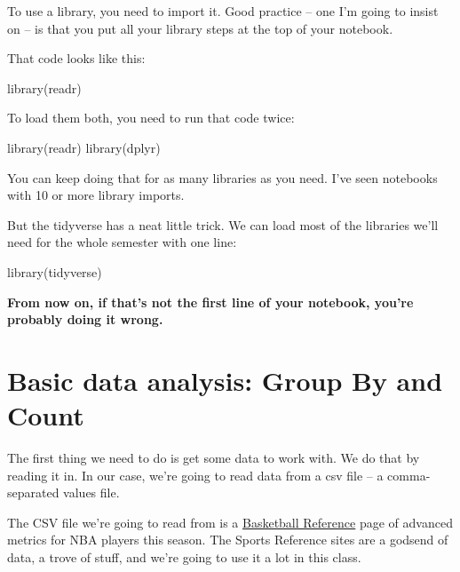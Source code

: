 \documentclass[
  letterpaper,
  DIV=11,
  numbers=noendperiod]{scrreprt}
\newenvironment{Shaded}{\begin{snugshade}}{\end{snugshade}}
\newcommand{\FunctionTok}[1]{\textcolor[rgb]{0.28,0.35,0.67}{#1}}
\newcommand{\NormalTok}[1]{\textcolor[rgb]{0.00,0.23,0.31}{#1}}
\begin{document}
To use a library, you need to import it. Good practice -- one I'm going
to insist on -- is that you put all your library steps at the top of
your notebook.

That code looks like this:

\begin{Shaded}
\begin{Highlighting}[]
\FunctionTok{library}\NormalTok{(readr)}
\end{Highlighting}
\end{Shaded}

To load them both, you need to run that code twice:

\begin{Shaded}
\begin{Highlighting}[]
\FunctionTok{library}\NormalTok{(readr)}
\FunctionTok{library}\NormalTok{(dplyr)}
\end{Highlighting}
\end{Shaded}

You can keep doing that for as many libraries as you need. I've seen
notebooks with 10 or more library imports.

But the tidyverse has a neat little trick. We can load most of the
libraries we'll need for the whole semester with one line:

\begin{Shaded}
\begin{Highlighting}[]
\FunctionTok{library}\NormalTok{(tidyverse)}
\end{Highlighting}
\end{Shaded}

\textbf{From now on, if that's not the first line of your notebook,
you're probably doing it wrong.}

\hypertarget{basic-data-analysis-group-by-and-count}{%
\section{Basic data analysis: Group By and
Count}\label{basic-data-analysis-group-by-and-count}}

The first thing we need to do is get some data to work with. We do that
by reading it in. In our case, we're going to read data from a csv file
-- a comma-separated values file.

The CSV file we're going to read from is a
\href{https://www.basketball-reference.com/leagues/NBA_2020_advanced.html}{Basketball
Reference} page of advanced metrics for NBA players this season. The
Sports Reference sites are a godsend of data, a trove of stuff, and
we're going to use it a lot in this class.
\end{document}
